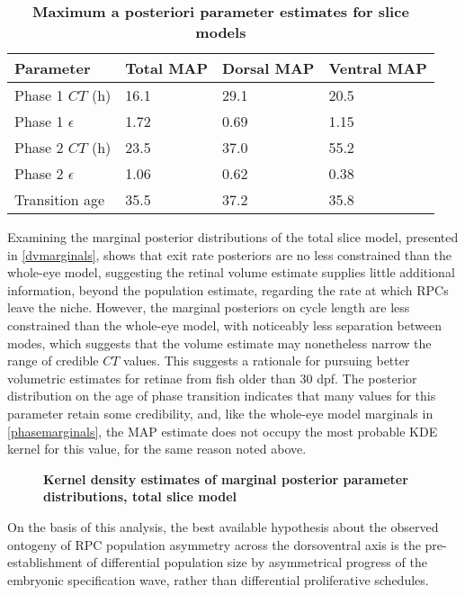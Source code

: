 \begin{table}[!ht]
    \centering
    \caption{{\bf Maximum a posteriori parameter estimates for slice models}}
    \begin{tabular}{|l|l|l|l|}
        \hline
        {\bf Parameter} & {\bf Total MAP} & {\bf Dorsal MAP} & {\bf Ventral MAP}\\ \hline
        Phase 1 $CT$ (h) & 16.1 & 29.1 & 20.5\\ \hline
        Phase 1 $\epsilon$ & 1.72 & 0.69 & 1.15\\ \hline
        Phase 2 $CT$ (h) & 23.5 & 37.0 & 55.2\\ \hline
        Phase 2 $\epsilon$ & 1.06 & 0.62 & 0.38\\ \hline
        Transition age & 35.5 & 37.2 & 35.8\\ \hline
        \end{tabular}
    \begin{flushleft} 
    \end{flushleft}
    \label{dvMAPtable}
\end{table}

Examining the marginal posterior distributions of the total slice model, presented in \autoref{dvmarginals}, shows that exit rate posteriors are no less constrained than the whole-eye model, suggesting the retinal volume estimate supplies little additional  information, beyond the population estimate, regarding the rate at which RPCs leave the niche. However, the marginal posteriors on cycle length are less constrained than the whole-eye model, with noticeably less separation between modes, which suggests that the volume estimate may nonetheless narrow the range of credible $CT$ values. This suggests a rationale for pursuing better volumetric estimates for retinae from fish older than 30 dpf. The posterior distribution on the age of phase transition indicates that many values for this parameter retain some credibility, and, like the whole-eye model marginals in \autoref{phasemarginals}, the MAP estimate does not occupy the most probable KDE kernel for this value, for the same reason noted above.

\begin{figure}[!h]
    \caption{{\bf Kernel density estimates of marginal posterior parameter distributions, total slice model}}
    \label{dvmarginals}
\end{figure}

On the basis of this analysis, the best available hypothesis about the observed ontogeny of RPC population asymmetry across the dorsoventral axis is the pre-establishment of differential population size by asymmetrical progress of the embryonic specification wave, rather than differential proliferative schedules.

